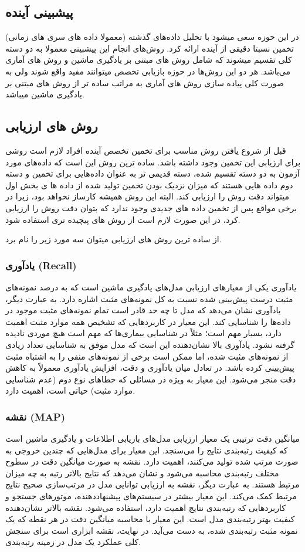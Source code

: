 \subsection*{پیشبینی آینده}
در این حوزه سعی میشود با تحلیل داده‌های گذشته (معمولا داده های سری های زمانی) تخمین نسبتا دقیقی از آینده ارائه کرد.
روش‌های انجام این پیشبینی معمولا به دو دسته کلی تقسیم میشوند که شامل روش های مبتنی بر یادگیری ماشین و روش های آماری می‌باشد.
هر دو این روش‌ها در حوزه بازیابی تخصص میتوانند مفید واقع شوند ولی به صورت کلی پیاده سازی روش های آماری به مراتب ساده تر از روش های مبتنی بر یادگیری ماشین میباشد.


\subsection*{روش های ارزیابی}
قبل از شروع یافتن روش مناسب برای تخمین تخصص آینده افراد لازم است روشی برای ارزیابی این تخمین وجود داشته باشد.
ساده ترین روش این است که داده‌های مورد آزمون به دو دسته تقسیم شده، دسته قدیمی تر به عنوان داده‌‌هایی برای تخمین و دسته دوم داده هایی هستند که میزان نزدیک بودن تخمین تولید شده از داده ها ی بخش اول میتواند دقت روش را ارزیابی کند.
البته این روش همیشه کارساز نخواهد بود، زیرا در برخی مواقع پس از تخمین داده های جدیدی وجود ندارد که بتوان دقت روش را ارزیابی کرد، در این صورت لازم است از روش های پیچیده تری استفاده شود.

از ساده ترین روش های ارزیابی میتوان سه مورد زیر را نام برد.
\subsubsection*{یادآوری (Recall)}
یادآوری یکی از معیارهای ارزیابی مدل‌های یادگیری ماشین است که به درصد نمونه‌های مثبت درست پیش‌بینی شده نسبت به کل نمونه‌های مثبت اشاره دارد. به عبارت دیگر، یادآوری نشان می‌دهد که مدل تا چه حد قادر است تمام نمونه‌های مثبت موجود در داده‌ها را شناسایی کند. این معیار در کاربردهایی که تشخیص همه موارد مثبت اهمیت دارد، بسیار مهم است؛ مثلاً در شناسایی بیماری‌ها که مهم است هیچ موردی نادیده گرفته نشود. یادآوری بالا نشان‌دهنده این است که مدل موفق به شناسایی تعداد زیادی از نمونه‌های مثبت شده، اما ممکن است برخی از نمونه‌های منفی را به اشتباه مثبت پیش‌بینی کرده باشد. در تعادل میان یادآوری و دقت، افزایش یادآوری معمولاً به کاهش دقت منجر می‌شود. این معیار به ویژه در مسائلی که خطاهای نوع دوم (عدم شناسایی موارد مثبت) حیاتی است، اهمیت دارد.

\subsubsection*{نقشه (MAP)}
 میانگین دقت ترتیبی یک معیار ارزیابی مدل‌های بازیابی اطلاعات و یادگیری ماشین است که کیفیت رتبه‌بندی نتایج را می‌سنجد. این معیار برای مدل‌هایی که چندین خروجی به صورت مرتب شده تولید می‌کنند، اهمیت دارد. نقشه به صورت میانگین دقت در سطوح مختلف رتبه‌بندی محاسبه می‌شود و نشان می‌دهد که نتایج بالاتر رتبه به چه میزان مرتبط هستند. به عبارت دیگر، نقشه به ارزیابی توانایی مدل در مرتب‌سازی صحیح نتایج مرتبط کمک می‌کند. این معیار بیشتر در سیستم‌های پیشنهاددهنده، موتورهای جستجو و کاربردهایی که رتبه‌بندی نتایج اهمیت دارد، استفاده می‌شود. نقشه بالاتر نشان‌دهنده کیفیت بهتر رتبه‌بندی مدل است. این معیار با محاسبه میانگین دقت در هر نقطه که یک نمونه مثبت رتبه‌بندی شده، به دست می‌آید. در نهایت، نقشه ابزاری است برای سنجش کلی عملکرد یک مدل در زمینه رتبه‌بندی.

